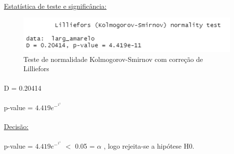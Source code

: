 \documentclass{article}
\begin{document}
\paragraph{}
\paragraph{}
\paragraph{}
\paragraph{}

\paragraph{} \underline{Estatística de teste e significância:}

\begin{figure}[h]
       \centering %
        \includegraphics[scale=0.8]{teste_de_normalidade_para_a_1a_hipotese.png} 
       \caption{Teste de normalidade Kolmogorov-Smirnov com correção de Lilliefors}
       \label{fig:logo}
    \end{figure}
    
\paragraph{} D = 0.20414 
\paragraph{} p-value = \begin{math}4.419e^-^1^1\end{math}
\paragraph{} \underline{Decisão:}
\paragraph{} p-value = \begin{math}4.419e^-^1^1\end{math} \begin{math}<\end{math} 0.05 = \begin{math}\alpha\end{math} , logo rejeita-se a hipótese H0.
\end{document}
